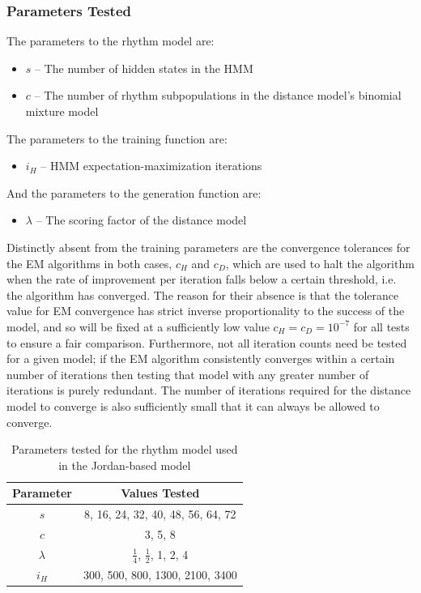 \documentclass[ author={Stephen Livermore-Tozer},
				supervisor={Dr. Peter Flach},
				degree={MEng},
				title={Algorithmic Co-composition Using Machine Learning},
				subtitle={},
				type={research},
				year={2016} ]{dissertation}
\begin{document}
	\subsubsection{Parameters Tested}
	
	The parameters to the rhythm model are:
	\begin{itemize}
		\item $s$ -- The number of hidden states in the HMM
		\item $c$ -- The number of rhythm subpopulations in the distance model's binomial mixture model
	\end{itemize}
	The parameters to the training function are:
	\begin{itemize}
		\item $i_H$ -- HMM expectation-maximization iterations
	\end{itemize}
	And the parameters to the generation function are:
	\begin{itemize}
		\item $\lambda$ -- The scoring factor of the distance model
	\end{itemize}
	
	Distinctly absent from the training parameters are the convergence tolerances for the EM algorithms in both cases, $c_H$ and $c_D$, which are used to halt the algorithm when the rate of improvement per iteration falls below a certain threshold, i.e. the algorithm has converged. The reason for their absence is that the tolerance value for EM convergence has strict inverse proportionality to the success of the model, and so will be fixed at a sufficiently low value $c_H = c_D = 10^{-7}$ for all tests to ensure a fair comparison. Furthermore, not all iteration counts need be tested for a given model; if the EM algorithm consistently converges within a certain number of iterations then testing that model with any greater number of iterations is purely redundant. The number of iterations required for the distance model to converge is also sufficiently small that it can always be allowed to converge. 
	
	\begin{table}[h]
		\begin{center}
			\begin{tabular}{cc}
				\toprule
				Parameter & Values Tested\\
				\hline
				$s$ & 8, 16, 24, 32, 40, 48, 56, 64, 72\\
				$c$ & 3, 5, 8\\
				$\lambda$ & $\frac{1}{4}$, $\frac{1}{2}$, 1, 2, 4\\
				$i_H$ & 300, 500, 800, 1300, 2100, 3400\\
				\bottomrule
			\end{tabular}
		\end{center}
		\caption{Parameters tested for the rhythm model used in the Jordan-based model}
		\label{tab:jordan-rhythm-parameters}
	\end{table}
	
\end{document}
